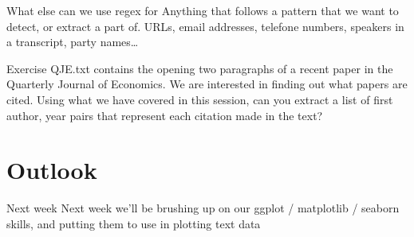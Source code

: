 \documentclass[
  10pt,
  ignorenonframetext,
  aspectratio=169]{beamer}
\newif\ifbibliography
\begin{document}
\begin{frame}{What else can we use regex for}
\protect\hypertarget{what-else-can-we-use-regex-for}{}
Anything that follows a pattern that we want to detect, or extract a
part of. URLs, email addresses, telefone numbers, speakers in a
transcript, party names\ldots{}
\end{frame}

\begin{frame}{Exercise}
\protect\hypertarget{exercise-1}{}
QJE.txt contains the opening two paragraphs of a recent paper in the
Quarterly Journal of Economics. We are interested in finding out what
papers are cited. Using what we have covered in this session, can you
extract a list of first author, year pairs that represent each citation
made in the text?
\end{frame}

\hypertarget{outlook}{%
\section{Outlook}\label{outlook}}

\begin{frame}{Next week}
\protect\hypertarget{next-week}{}
Next week we'll be brushing up on our ggplot / matplotlib / seaborn
skills, and putting them to use in plotting text data
\end{frame}

\begin{frame}[allowframebreaks]{}
  \bibliographytrue
  
\end{frame}
\end{document}
